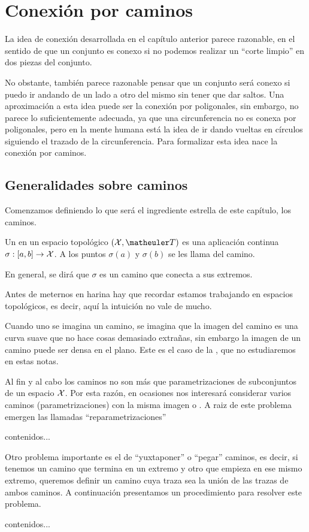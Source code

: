\chapter{Conexión por caminos}
\label{cam}
La idea de conexión desarrollada en el capítulo anterior parece razonable, en el sentido de que un conjunto es conexo si no podemos realizar un ``corte limpio'' en dos piezas del conjunto.

No obstante, también parece razonable pensar que un conjunto será conexo si puedo ir andando de un lado a otro del mismo sin tener que dar saltos. Una aproximación a esta idea puede ser la conexión por poligonales, sin embargo, no parece lo suficientemente adecuada, ya que una circunferencia no es conexa por poligonales, pero en la mente humana está la idea de ir dando vueltas en círculos siguiendo el trazado de la circunferencia. Para formalizar esta idea nace la conexión por caminos.
\section{Generalidades sobre caminos}
Comenzamos definiendo lo que será el ingrediente estrella de este capítulo, los caminos.
\begin{defi}[Camino]
	Un  en un espacio topológico $(\X,\T)$ es una aplicación continua $\sigma:[a,b]\to\mathcal{X}$. A los puntos $\sigma(a)$ y $\sigma(b)$ se les llama  del camino.
	
	En general, se dirá que $\sigma$ es un camino que conecta a sus extremos.
\end{defi}
Antes de meternos en harina hay que recordar estamos trabajando en espacios topológicos, es decir, aquí la intuición no vale de mucho.
\begin{obs}
	Cuando uno se imagina un camino, se imagina que la imagen del camino es una curva suave que no hace cosas demasiado extrañas, sin embargo la imagen de un camino puede ser densa en el plano. Este es el caso de la , que no estudiaremos en estas notas.
\end{obs}
Al fin y al cabo los caminos no son más que parametrizaciones de subconjuntos de un espacio $\mathcal{X}$. Por esta razón, en ocasiones nos interesará considerar varios caminos (parametrizaciones) con la misma imagen o . A raiz de este problema emergen las llamadas ``reparametrizaciones''
\begin{obs}[Reparametrización]
	contenidos...
\end{obs}
Otro problema importante es el de ``yuxtaponer'' o ``pegar'' caminos, es decir, si tenemos un camino que termina en un extremo y otro que empieza en ese mismo extremo, queremos definir un camino cuya traza sea la unión de las trazas de ambos caminos. A continuación presentamos un procedimiento para resolver este problema.
\begin{exa}
	contenidos...
\end{exa}

